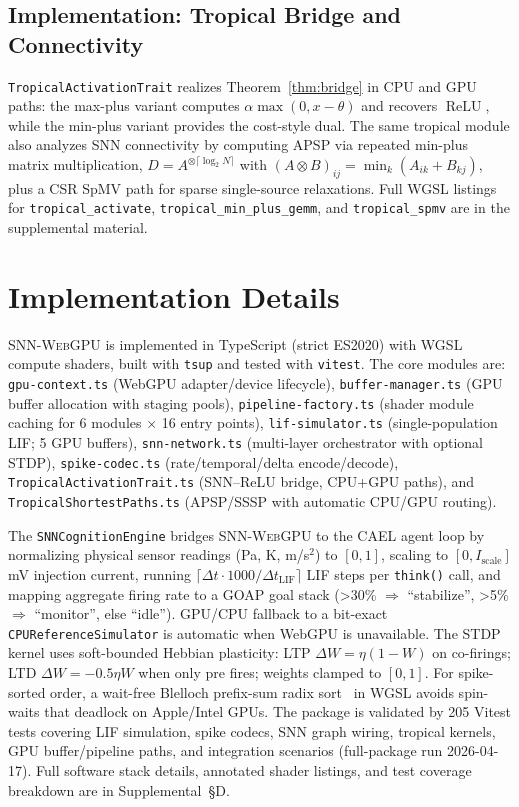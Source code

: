 \documentclass[10pt]{article}
\newcommand{\snnwebgpu}{\textsc{SNN-WebGPU}}
\newcommand{\cael}{\textsc{CAEL}}
\newcommand{\relu}{\operatorname{ReLU}}
\begin{document}
\subsection{Implementation: Tropical Bridge and Connectivity}

\texttt{TropicalActivationTrait} realizes Theorem~\ref{thm:bridge} in CPU and
GPU paths: the max-plus variant computes
$\alpha\max(0,x-\theta)$ and recovers $\relu{}$, while the min-plus variant
provides the cost-style dual.
The same tropical module also analyzes SNN connectivity by computing APSP via
repeated min-plus matrix multiplication,
$D=A^{\otimes\lceil\log_2 N\rceil}$ with
$(A\otimes B)_{ij}=\min_k(A_{ik}+B_{kj})$, plus a CSR SpMV path for sparse
single-source relaxations.
Full WGSL listings for \texttt{tropical\_activate},
\texttt{tropical\_min\_plus\_gemm}, and \texttt{tropical\_spmv} are in the
supplemental material.

\section{Implementation Details}
\label{sec:implementation}

\snnwebgpu{} is implemented in TypeScript (strict ES2020) with WGSL compute shaders, built with \texttt{tsup} and tested with \texttt{vitest}.
The core modules are: \texttt{gpu-context.ts} (WebGPU adapter/device lifecycle), \texttt{buffer-manager.ts} (GPU buffer allocation with staging pools), \texttt{pipeline-factory.ts} (shader module caching for 6 modules $\times$ 16 entry points), \texttt{lif-simulator.ts} (single-population LIF; 5 GPU buffers), \texttt{snn-network.ts} (multi-layer orchestrator with optional STDP), \texttt{spike-codec.ts} (rate/temporal/delta encode/decode), \texttt{TropicalActivationTrait.ts} (SNN--ReLU bridge, CPU+GPU paths), and \texttt{TropicalShortestPaths.ts} (APSP/SSSP with automatic CPU/GPU routing).

The \texttt{SNNCognitionEngine} bridges \snnwebgpu{} to the \cael{} agent loop by normalizing physical sensor readings (Pa, K, m/s$^2$) to $[0,1]$, scaling to $[0, I_\mathrm{scale}]$ mV injection current, running $\lceil \Delta t \cdot 1000 / \Delta t_\mathrm{LIF} \rceil$ LIF steps per \texttt{think()} call, and mapping aggregate firing rate to a GOAP goal stack (\textgreater30\% $\Rightarrow$ ``stabilize'', \textgreater5\% $\Rightarrow$ ``monitor'', else ``idle'').
GPU/CPU fallback to a bit-exact \texttt{CPUReferenceSimulator} is automatic when WebGPU is unavailable.
The STDP kernel uses soft-bounded Hebbian plasticity: LTP $\Delta W = \eta(1-W)$ on co-firings; LTD $\Delta W = -0.5\eta W$ when only pre fires; weights clamped to $[0,1]$.
For spike-sorted order, a wait-free Blelloch prefix-sum radix sort~\cite{blelloch1990prefix} in WGSL avoids spin-waits that deadlock on Apple/Intel GPUs.
The package is validated by 205 Vitest tests covering LIF simulation, spike codecs, SNN graph wiring, tropical kernels, GPU buffer/pipeline paths, and integration scenarios (full-package run 2026-04-17).
Full software stack details, annotated shader listings, and test coverage breakdown are in Supplemental~\S{D}.
\end{document}
